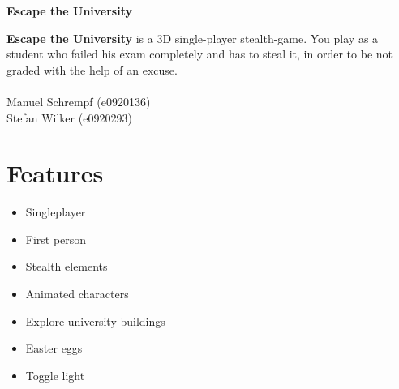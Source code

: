 \documentclass[12pt]{article}
\begin{document}
\newpage
\pagestyle{plain}
\setcounter{page}{1}

\begin{Huge}
\textbf{
Escape the University}
	
\end{Huge}


\begin{minipage}{0.45\textwidth}


\textbf{Escape the University} is a 3D single-player stealth-game. You play as a student who failed his exam completely and has to steal it, in order to be not graded with the help of an excuse. \\\\
	Manuel Schrempf (e0920136)\\
	Stefan Wilker   (e0920293)
	
	\section*{Features} 
	\begin{itemize}
		\item Singleplayer
		\item First person
		\item Stealth elements
		\item Animated characters
		\item Explore university buildings
		\item Easter eggs
		\item Toggle light
	\end{itemize}

\end{minipage} \hfill
\end{document}
